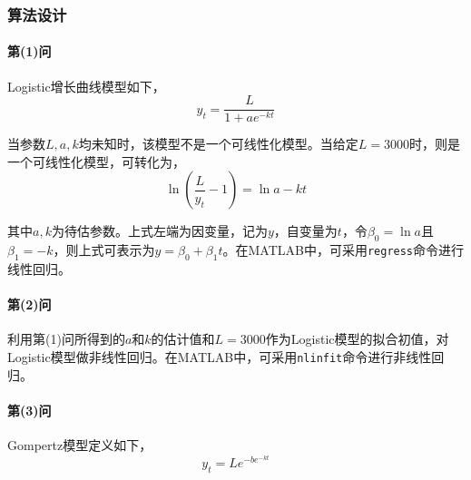 
\subsubsection{算法设计}

\paragraph{第(1)问} Logistic增长曲线模型如下，
\begin{equation}
    y_t = \frac{L}{1 + a e^{-kt}}
\end{equation}

当参数$L,a,k$均未知时，该模型不是一个可线性化模型。当给定$L=3000$时，则是一个可线性化模型，可转化为，
\begin{equation}
    \ln\left(\frac{L}{y_t} - 1\right) = \ln a - kt
\end{equation}

其中$a,k$为待估参数。上式左端为因变量，记为$y$，自变量为$t$，令$\beta_0 = \ln a$且$\beta_1 = -k$，则上式可表示为$y = \beta_0 + \beta_1 t$。在MATLAB中，可采用\texttt{regress}命令进行线性回归。

\paragraph{第(2)问} 利用第(1)问所得到的$a$和$k$的估计值和$L=3000$作为Logistic模型的拟合初值，对Logistic模型做非线性回归。在MATLAB中，可采用\texttt{nlinfit}命令进行非线性回归。

\paragraph{第(3)问} Gompertz模型定义如下，
\begin{equation}
    y_t = L e^{-b e^{-kt}}
\end{equation}


